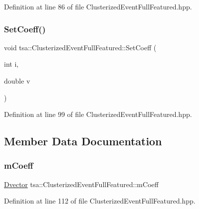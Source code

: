 Definition at line 86 of file Clusterized\+Event\+Full\+Featured.\+hpp.

\mbox{\label{classtsa_1_1_clusterized_event_full_featured_afd84fc016025a423c11d2febaba095c9}} 
\subsubsection{\texorpdfstring{Set\+Coeff()}{SetCoeff()}}
{\footnotesize\ttfamily void tsa\+::\+Clusterized\+Event\+Full\+Featured\+::\+Set\+Coeff (\begin{DoxyParamCaption}\item[{int}]{i,  }\item[{double}]{v }\end{DoxyParamCaption})\hspace{0.3cm}{\ttfamily [inline]}}



Definition at line 99 of file Clusterized\+Event\+Full\+Featured.\+hpp.



\subsection{Member Data Documentation}
\mbox{\label{classtsa_1_1_clusterized_event_full_featured_a3361bc03902ba355a8f5cd387f57224d}} 
\subsubsection{\texorpdfstring{m\+Coeff}{mCoeff}}
{\footnotesize\ttfamily \hyperlink{classtsa_1_1_clusterized_event_full_featured_a3b6ced7b46c6d82cd122cc6c2b5c2178}{Dvector} tsa\+::\+Clusterized\+Event\+Full\+Featured\+::m\+Coeff}



Definition at line 112 of file Clusterized\+Event\+Full\+Featured.\+hpp.

